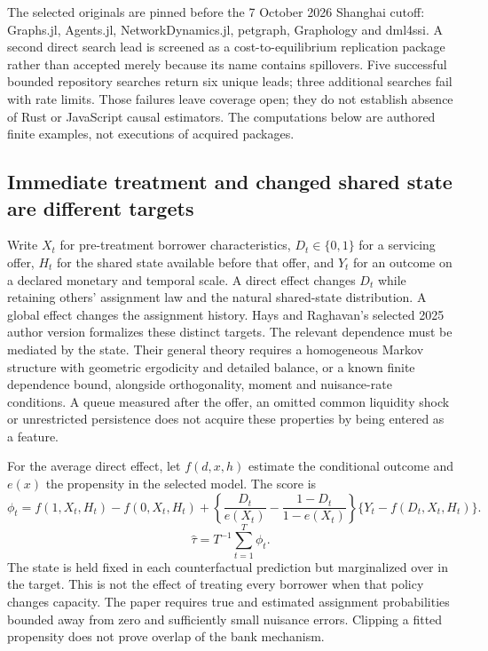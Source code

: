 The selected originals are pinned before the 7 October 2026 Shanghai cutoff:
Graphs.jl, Agents.jl, NetworkDynamics.jl, petgraph, Graphology and dml4ssi.
A second direct search lead is screened as a cost-to-equilibrium replication
package rather than accepted merely because its name contains spillovers.
Five successful bounded repository searches return six unique leads; three
additional searches fail with rate limits. Those failures leave coverage open;
they do not establish absence of Rust or JavaScript causal estimators. The
computations below are authored finite examples, not executions of acquired
packages.~\citep{exec25_onet_choice}

\subsection{Immediate treatment and changed shared state are different targets}

Write $X_t$ for pre-treatment borrower characteristics, $D_t\in\{0,1\}$ for a
servicing offer, $H_t$ for the shared state available before that offer, and
$Y_t$ for an outcome on a declared monetary and temporal scale. A direct effect
changes $D_t$ while retaining others' assignment law and the natural
shared-state distribution. A global effect changes the assignment history.
Hays and Raghavan's selected 2025 author version formalizes these distinct
targets. The relevant dependence must be mediated by the state. Their general
theory requires a homogeneous Markov structure with geometric ergodicity and
detailed balance, or a known finite dependence bound, alongside orthogonality,
moment and nuisance-rate conditions. A queue measured after the offer, an
omitted common liquidity shock or unrestricted persistence does not acquire
these properties by being entered as a feature.~\citep{exec25_onet_paper}

For the average direct effect, let $f(d,x,h)$ estimate the conditional outcome
and $e(x)$ the propensity in the selected model. The score is
\[
 \phi_t=f(1,X_t,H_t)-f(0,X_t,H_t)
 +\left\{\frac{D_t}{e(X_t)}-\frac{1-D_t}{1-e(X_t)}\right\}
   \{Y_t-f(D_t,X_t,H_t)\}.
\]
\[
 \widehat\tau=T^{-1}\sum_{t=1}^T\phi_t.
\]
The state is held fixed in each counterfactual prediction but marginalized
over in the target. This is not the effect of treating every borrower when
that policy changes capacity. The paper requires true and estimated assignment
probabilities bounded away from zero and sufficiently small nuisance errors.
Clipping a fitted propensity does not prove overlap of the bank mechanism.
\citep{exec25_onet_paper}

